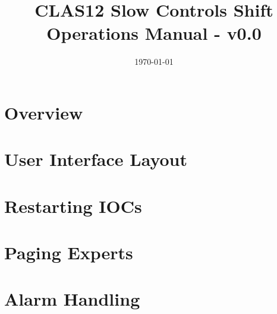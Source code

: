 \documentclass[amsmath,amssymb,notitlepage,11pt]{revtex4}
\begin{document}
\title{CLAS12 Slow Controls Shift Operations Manual - v0.0}
\date{\today}
\begin{abstract}
\end{abstract}

\maketitle
\tableofcontents
\newpage

\section{Overview}

\section{User Interface Layout}

\section{Restarting IOCs}

\section{Paging Experts}

\section{Alarm Handling}

%
\end{document}
